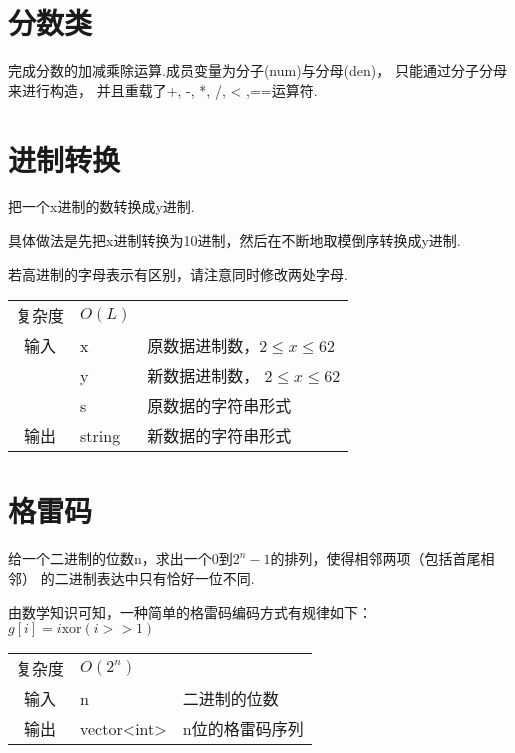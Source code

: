 \section{分数类}\small
完成分数的加减乘除运算.成员变量为分子(num)与分母(den)，
只能通过分子分母来进行构造，
并且重载了+, -, *, /, < ,==运算符.



\section{进制转换}\small
把一个x进制的数转换成y进制.

具体做法是先把x进制转换为10进制，然后在不断地取模倒序转换成y进制.

若高进制的字母表示有区别，请注意同时修改两处字母.
\begin{longtable}{|c|l|l|}
复杂度 & $O(L)$ &  \\
输入 & x & 原数据进制数，$2 \leq x \leq 62$ \\
 & y & 新数据进制数， $2 \leq x \leq 62$ \\
 & s & 原数据的字符串形式 \\
输出 & string & 新数据的字符串形式 \\
\end{longtable}



\section{格雷码}\small
给一个二进制的位数n，求出一个0到$2^n-1$的排列，使得相邻两项（包括首尾相邻）
的二进制表达中只有恰好一位不同.

由数学知识可知，一种简单的格雷码编码方式有规律如下：$g[i] = i \text{xor} (i >> 1)$

\begin{longtable}{|c|l|l|}
复杂度 & $O(2^{n})$ & \\
输入 & n & 二进制的位数 \\
输出 & vector<int> & n位的格雷码序列 \\
\end{longtable}
